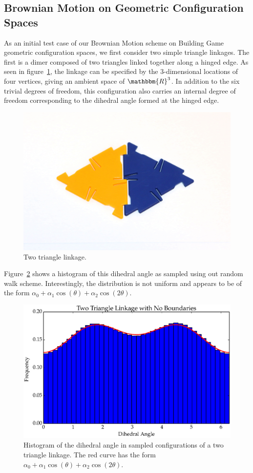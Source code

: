 \subsection{Brownian Motion on Geometric Configuration Spaces}
\label{ssc:MBMGCS}
As an initial test case of our Brownian Motion scheme on Building Game geometric configuration spaces, we first consider two simple triangle linkages. The first is a dimer composed of two triangles linked together along a hinged edge. As seen in figure~\ref{fig:T2_diagram}, the linkage can be specified by the $3$-dimensional locations of four vertices, giving an ambient space of $\mathbbm{R}^3$. In addition to the six trivial degrees of freedom, this configuration also carries an internal degree of freedom corresponding to the dihedral angle formed at the hinged edge. 
\begin{figure}[ht]
\centering
  \includegraphics[scale=0.1]{images/T2_diagram.eps}
\caption{Two triangle linkage.}
\label{fig:T2_diagram}
\end{figure}
Figure~\ref{fig:T2_1} shows a histogram of this dihedral angle as sampled using out random walk scheme. Interestingly, the distribution is not uniform and appears to be of the form $\alpha_0 + \alpha_1\cos(\theta) + \alpha_2\cos(2\theta)$. 
\begin{figure}[ht]
\centering
  \includegraphics[scale=0.6]{images/T2_1.eps}
\caption{Histogram of the dihedral angle in sampled configurations of a two triangle linkage. The red curve has the form $\alpha_0 + \alpha_1\cos(\theta) + \alpha_2\cos(2\theta)$.}
\label{fig:T2_1}
\end{figure}

